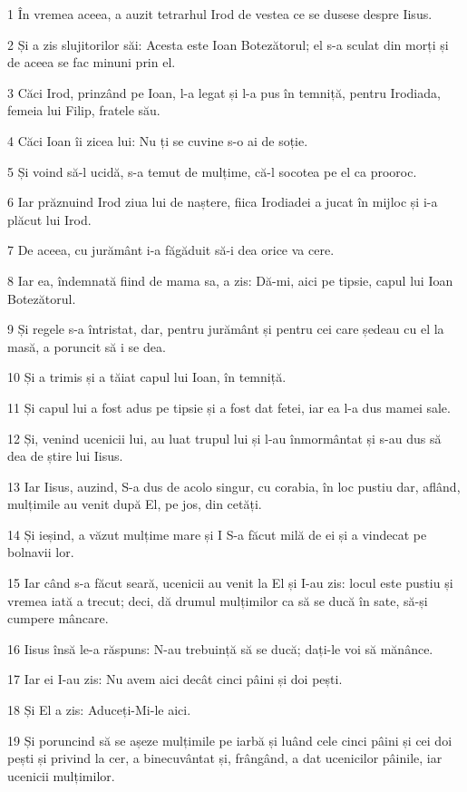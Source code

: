 \par 1 În vremea aceea, a auzit tetrarhul Irod de vestea ce se dusese despre Iisus.
\par 2 Și a zis slujitorilor săi: Acesta este Ioan Botezătorul; el s-a sculat din morți și de aceea se fac minuni prin el.
\par 3 Căci Irod, prinzând pe Ioan, l-a legat și l-a pus în temniță, pentru Irodiada, femeia lui Filip, fratele său.
\par 4 Căci Ioan îi zicea lui: Nu ți se cuvine s-o ai de soție.
\par 5 Și voind să-l ucidă, s-a temut de mulțime, că-l socotea pe el ca prooroc.
\par 6 Iar prăznuind Irod ziua lui de naștere, fiica Irodiadei a jucat în mijloc și i-a plăcut lui Irod.
\par 7 De aceea, cu jurământ i-a făgăduit să-i dea orice va cere.
\par 8 Iar ea, îndemnată fiind de mama sa, a zis: Dă-mi, aici pe tipsie, capul lui Ioan Botezătorul.
\par 9 Și regele s-a întristat, dar, pentru jurământ și pentru cei care ședeau cu el la masă, a poruncit să i se dea.
\par 10 Și a trimis și a tăiat capul lui Ioan, în temniță.
\par 11 Și capul lui a fost adus pe tipsie și a fost dat fetei, iar ea l-a dus mamei sale.
\par 12 Și, venind ucenicii lui, au luat trupul lui și l-au înmormântat și s-au dus să dea de știre lui Iisus.
\par 13 Iar Iisus, auzind, S-a dus de acolo singur, cu corabia, în loc pustiu dar, aflând, mulțimile au venit după El, pe jos, din cetăți.
\par 14 Și ieșind, a văzut mulțime mare și I S-a făcut milă de ei și a vindecat pe bolnavii lor.
\par 15 Iar când s-a făcut seară, ucenicii au venit la El și I-au zis: locul este pustiu și vremea iată a trecut; deci, dă drumul mulțimilor ca să se ducă în sate, să-și cumpere mâncare.
\par 16 Iisus însă le-a răspuns: N-au trebuință să se ducă; dați-le voi să mănânce.
\par 17 Iar ei I-au zis: Nu avem aici decât cinci pâini și doi pești.
\par 18 Și El a zis: Aduceți-Mi-le aici.
\par 19 Și poruncind să se așeze mulțimile pe iarbă și luând cele cinci pâini și cei doi pești și privind la cer, a binecuvântat și, frângând, a dat ucenicilor pâinile, iar ucenicii mulțimilor.
